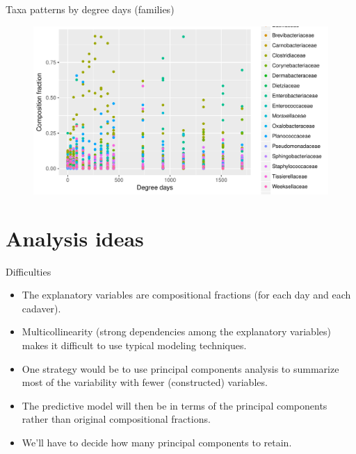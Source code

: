 \documentclass{beamer}
\begin{document}
\begin{frame}{Taxa patterns by degree days (families)}

\begin{center}
\begin{figure}
  \includegraphics[width=4.5in]{families_scatter_frac_by_degday}
\end{figure}
\end{center}
\vspace{-0.1in}

\end{frame}


\section{Analysis ideas}


\begin{frame}{Difficulties}
  
\begin{itemize}
\item The explanatory variables are compositional fractions (for each day and each cadaver).
\item Multicollinearity (strong dependencies among the explanatory variables) makes it difficult to use typical modeling techniques.
\item One strategy would be to use principal components analysis to summarize most of the variability with fewer (constructed) variables.
\item The predictive model will then be in terms of the principal components rather than original compositional fractions.
  \item We'll have to decide how many principal components to retain.
\end{itemize}

\end{frame}
\end{document}
